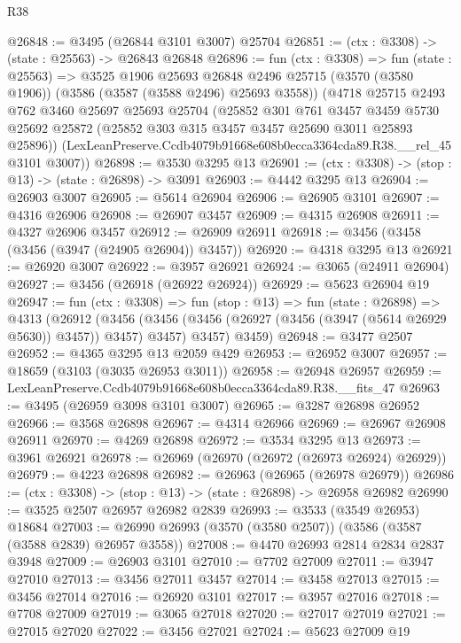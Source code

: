 \begin{lexlean}{R38}
\begin{coremodule}
@26848 := @3495 (@26844 @3101 @3007) @25704
@26851 := (ctx : @3308) -> (state : @25563) -> @26843 @26848
@26896 := fun (ctx : @3308) =>
  fun (state : @25563) =>
  @3525
    @1906
    @25693
    @26848
    @2496
    @25715
    (@3570 (@3580 @1906))
    (@3586 (@3587 (@3588 @2496) @25693 @3558))
    (@4718
      @25715
      @2493
      @762
      @3460
      @25697
      @25693
      @25704
      (@25852
        @301
        @761
        @3457
        @3459
        @5730
        @25692
        @25872
        (@25852 @303 @315 @3457 @3457 @25690 @3011 @25893 @25896))
      (LexLeanPreserve.Ccdb4079b91668e608b0ecca3364cda89.R38.__rel_45 @3101 @3007))
@26898 := @3530 @3295 @13
@26901 := (ctx : @3308) -> (stop : @13) -> (state : @26898) -> @3091
@26903 := @4442 @3295 @13
@26904 := @26903 @3007
@26905 := @5614 @26904
@26906 := @26905 @3101
@26907 := @4316 @26906
@26908 := @26907 @3457
@26909 := @4315 @26908
@26911 := @4327 @26906 @3457
@26912 := @26909 @26911
@26918 := @3456 (@3458 (@3456 (@3947 (@24905 @26904)) @3457))
@26920 := @4318 @3295 @13
@26921 := @26920 @3007
@26922 := @3957 @26921
@26924 := @3065 (@24911 @26904)
@26927 := @3456 (@26918 (@26922 @26924))
@26929 := @5623 @26904 @19
@26947 := fun (ctx : @3308) =>
  fun (stop : @13) =>
  fun (state : @26898) =>
  @4313
    (@26912
      (@3456 (@3456 (@3456 (@26927 (@3456 (@3947 (@5614 @26929 @5630)) @3457)) @3457) @3457) @3457)
      @3459)
@26948 := @3477 @2507
@26952 := @4365 @3295 @13 @2059 @429
@26953 := @26952 @3007
@26957 := @18659 (@3103 (@3035 @26953 @3011))
@26958 := @26948 @26957
@26959 := LexLeanPreserve.Ccdb4079b91668e608b0ecca3364cda89.R38.__fits_47
@26963 := @3495 (@26959 @3098 @3101 @3007)
@26965 := @3287 @26898 @26952
@26966 := @3568 @26898
@26967 := @4314 @26966
@26969 := @26967 @26908 @26911
@26970 := @4269 @26898
@26972 := @3534 @3295 @13
@26973 := @3961 @26921
@26978 := @26969 (@26970 (@26972 (@26973 @26924) @26929))
@26979 := @4223 @26898
@26982 := @26963 (@26965 (@26978 @26979))
@26986 := (ctx : @3308) -> (stop : @13) -> (state : @26898) -> @26958 @26982
@26990 := @3525 @2507 @26957 @26982 @2839
@26993 := @3533 (@3549 @26953) @18684
@27003 := @26990 @26993 (@3570 (@3580 @2507)) (@3586 (@3587 (@3588 @2839) @26957 @3558))
@27008 := @4470 @26993 @2814 @2834 @2837 @3948
@27009 := @26903 @3101
@27010 := @7702 @27009
@27011 := @3947 @27010
@27013 := @3456 @27011 @3457
@27014 := @3458 @27013
@27015 := @3456 @27014
@27016 := @26920 @3101
@27017 := @3957 @27016
@27018 := @7708 @27009
@27019 := @3065 @27018
@27020 := @27017 @27019
@27021 := @27015 @27020
@27022 := @3456 @27021
@27024 := @5623 @27009 @19

\end{coremodule}
\end{lexlean}
